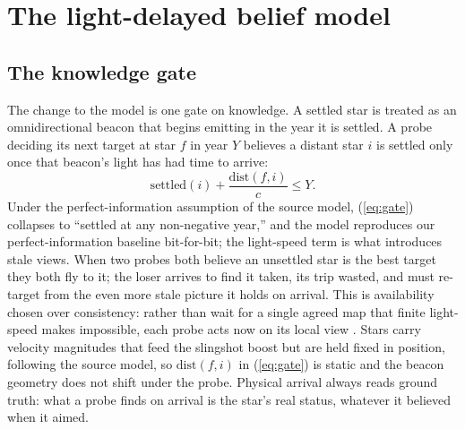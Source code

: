 \section{The light-delayed belief model}
\label{sec:model}

\subsection{The knowledge gate}
The change to the model is one gate on knowledge. A settled star is treated as an
omnidirectional beacon that begins emitting in the year it is settled. A probe deciding its
next target at star $f$ in year $Y$ believes a distant star $i$ is settled only once that
beacon's light has had time to arrive:
\begin{equation}
\text{settled}(i) + \frac{\mathrm{dist}(f, i)}{c} \le Y . \label{eq:gate}
\end{equation}
Under the perfect-information assumption of the source model, (\ref{eq:gate}) collapses to
``settled at any non-negative year,'' and the model reproduces our perfect-information
baseline bit-for-bit; the light-speed term is what introduces stale views. When two probes
both believe an unsettled star is the best target they both fly to it; the loser arrives to
find it taken, its trip wasted, and must re-target from the even more stale picture it holds on
arrival. This is availability chosen over consistency: rather than wait for a single agreed map
that finite light-speed makes impossible, each probe acts now on its local view
\citep{lamport-1978}. Stars carry velocity magnitudes that feed the slingshot boost but are held
fixed in position, following the source model, so $\mathrm{dist}(f,i)$ in (\ref{eq:gate}) is
static and the beacon geometry does not shift under the probe. Physical arrival always reads
ground truth: what a probe finds on arrival is the star's real status, whatever it believed
when it aimed.

